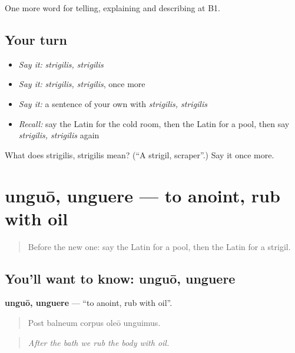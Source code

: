 \begin{grammarlens}[title={What you've built}]
One more word for telling, explaining and describing at B1.
\end{grammarlens}

\subsection*{Your turn}
\begin{itemize}
\raggedright
  \item \emph{Say it:} \emph{strigilis, strigilis}
  \item \emph{Say it:} \emph{strigilis, strigilis}, once more
  \item \emph{Say it:} a sentence of your own with \emph{strigilis, strigilis}
  \item \emph{Recall:} say the Latin for the cold room, then the Latin for a pool, then say \emph{strigilis, strigilis} again
\end{itemize}

\begin{tcolorbox}[breakable,colback=teal!4,colframe=teal!35!black,title={Before you move on}]
What does strigilis, strigilis mean? (\textquotedblleft{}A strigil, scraper\textquotedblright{}.) Say it once more.
\end{tcolorbox}
\section[unguō, unguere]{unguō, unguere — to anoint, rub with oil}

\label{lesson:LA-C542-unguo}



\begin{quote}
Before the new one: say the Latin for a pool, then the Latin for a strigil.
\end{quote}

\subsection*{You'll want to know: unguō, unguere}
\textbf{unguō, unguere} — \textquotedblleft{}to anoint, rub with oil\textquotedblright{}.

\begin{quote}
Post balneum corpus oleō unguimus.
\end{quote}

\begin{quote}
\emph{After the bath we rub the body with oil.}
\end{quote}

